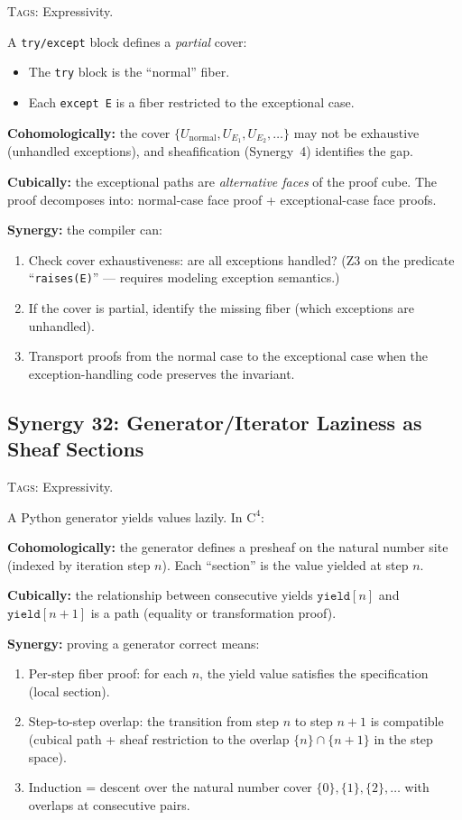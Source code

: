 \documentclass[11pt,a4paper]{article}
\theoremstyle{definition}
\theoremstyle{plain}
\begin{document}
\textsc{Tags:} Expressivity.

\medskip\noindent
A \texttt{try/except} block defines a \emph{partial} cover:
\begin{itemize}
\item The \texttt{try} block is the ``normal'' fiber.
\item Each \texttt{except E} is a fiber restricted to the
  exceptional case.
\end{itemize}

\textbf{Cohomologically:} the cover $\{U_{\mathrm{normal}},
U_{E_1}, U_{E_2}, \ldots\}$ may not be exhaustive (unhandled
exceptions), and sheafification (Synergy~4) identifies the gap.

\textbf{Cubically:} the exceptional paths are \emph{alternative
faces} of the proof cube.  The proof decomposes into: normal-case
face proof + exceptional-case face proofs.

\textbf{Synergy:} the compiler can:
\begin{enumerate}
\item Check cover exhaustiveness: are all exceptions handled?
  (Z3 on the predicate ``\texttt{raises(E)}'' --- requires modeling
  exception semantics.)
\item If the cover is partial, identify the missing fiber
  (which exceptions are unhandled).
\item Transport proofs from the normal case to the exceptional case
  when the exception-handling code preserves the invariant.
\end{enumerate}


\subsection{Synergy 32: Generator/Iterator Laziness as Sheaf Sections}
\label{sec:syn-generators}

\textsc{Tags:} Expressivity.

\medskip\noindent
A Python generator yields values lazily.  In $\mathrm{C}^4$:

\textbf{Cohomologically:} the generator defines a presheaf on the
natural number site (indexed by iteration step $n$).  Each
``section'' is the value yielded at step $n$.

\textbf{Cubically:} the relationship between consecutive yields
$\mathtt{yield}[n]$ and $\mathtt{yield}[n{+}1]$ is a path (equality
or transformation proof).

\textbf{Synergy:} proving a generator correct means:
\begin{enumerate}
\item Per-step fiber proof: for each $n$, the yield value satisfies
  the specification (local section).
\item Step-to-step overlap: the transition from step $n$ to step
  $n{+}1$ is compatible (cubical path + sheaf restriction to the
  overlap $\{n\} \cap \{n{+}1\}$ in the step space).
\item Induction = descent over the natural number cover
  $\{0\}, \{1\}, \{2\}, \ldots$ with overlaps at consecutive pairs.
\end{enumerate}
\end{document}
